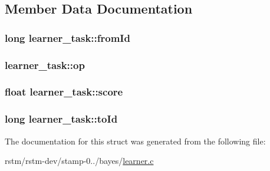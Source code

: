 \subsection{Member Data Documentation}
\hypertarget{structlearner__task_a03ce8c719f9853b0324d861b28eea9e8}{
\subsubsection[{from\-Id}]{\setlength{\rightskip}{0pt plus 5cm}long learner\-\_\-task\-::from\-Id}}\label{structlearner__task_a03ce8c719f9853b0324d861b28eea9e8}
\hypertarget{structlearner__task_a53d37a6e20de1fde3605548b2047fffb}{
\subsubsection[{op}]{ learner\-\_\-task\-::op}}\label{structlearner__task_a53d37a6e20de1fde3605548b2047fffb}
\hypertarget{structlearner__task_a27432e7e0f6675a9b11146245817d70a}{
\subsubsection[{score}]{\setlength{\rightskip}{0pt plus 5cm}float learner\-\_\-task\-::score}}\label{structlearner__task_a27432e7e0f6675a9b11146245817d70a}
\hypertarget{structlearner__task_a1886290311045ff06b0b6fef325d722a}{
\subsubsection[{to\-Id}]{\setlength{\rightskip}{0pt plus 5cm}long learner\-\_\-task\-::to\-Id}}\label{structlearner__task_a1886290311045ff06b0b6fef325d722a}


The documentation for this struct was generated from the following file\-:\begin{DoxyCompactItemize}
\item 
rstm/rstm-\/dev/stamp-\/0../bayes/\hyperlink{learner_8c}{learner.\-c}\end{DoxyCompactItemize}
